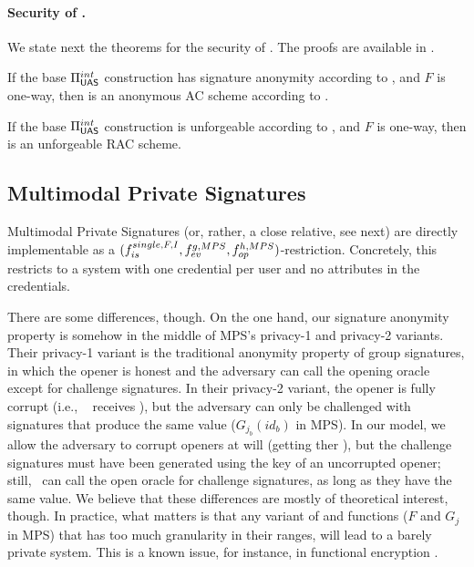 \paragraph{Security of \CUASRAC.} %
We state next the theorems for the security of \CUASRAC. The proofs are
available in .

\begin{theorem}
  If the base $\Pi_{\mathsf{UAS}}^{int}$ construction has signature anonymity according to
  , and $F$ is one-way, then \CUASRAC is an
  anonymous AC scheme according to \cite{fhs19}.  
\end{theorem}

\begin{theorem}
  If the base $\Pi_{\mathsf{UAS}}^{int}$ construction is unforgeable according to
  , and $F$ is one-way, then \CUASRAC is an unforgeable
  RAC scheme.
\end{theorem}


\subsection{Multimodal Private Signatures}
\label{ssec:related-models-mps}

Multimodal Private Signatures (or, rather, a close relative, see next) are
directly implementable as a $(f_{is}^{single,F,I},f_{ev}^{g,MPS},
f_{op}^{h,MPS})$-\CUASGen restriction. Concretely, this restricts to a system
with one credential per user and no attributes in the credentials.

There are some differences, though. On the one hand, our signature anonymity
property is somehow in the middle of MPS's privacy-1 and privacy-2 variants.
Their privacy-1 variant is the traditional anonymity property of group
signatures, in which the opener is honest and the adversary can call the opening
oracle except for challenge signatures. In their privacy-2 variant, the opener
is fully corrupt (i.e., \adv~ receives \osk), but the adversary can only be
challenged with signatures that produce the same \yinsp value ($G_{j_b}(id_b)$
in MPS). In our \UAS model, we allow the adversary to corrupt openers at will
(getting ther \osk), but the challenge signatures must have been generated using
the key of an uncorrupted opener; still, \adv~can call the open oracle for
challenge signatures, as long as they have the same \yinsp value. We believe
that these differences are mostly of theoretical interest, though. In practice,
what matters is that any variant of \feval and \finsp functions ($F$ and $G_j$
in MPS) that has too much granularity in their ranges, will lead to a barely
private system. This is a known issue, for instance, in functional encryption
\cite{bsw11}.

